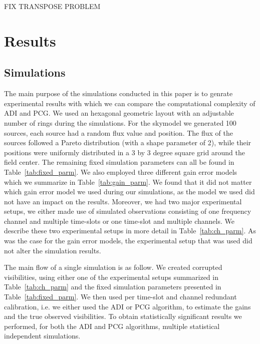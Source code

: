 \documentclass[useAMS,usenatbib]{mn2e}
\begin{document}
FIX TRANSPOSE PROBLEM

\section{Results}

\subsection{Simulations}
The main purpose of the simulations conducted in this paper is to genrate experimental results with which we can compare the computational complexity of ADI and PCG. We used an hexagonal geometric layout with an adjustable number of rings during the 
simulations. For the skymodel we generated 100 sources, each source had a random flux value and position. The flux of the sources followed a Pareto distribution (with a shape parameter of 2), while their positions were uniformly 
distributed in a 3 by 3 degree square grid around the field center. The remaining fixed simulation parameters can all be found in Table~\ref{tab:fixed_parm}. 
We also employed three different gain error models which we summarize in Table~\ref{tab:gain_parm}. We found that it did not matter which gain error model we used during
our simulations, as the model we used did not have an impact on the results. Moreover, we had two major experimental setups, we either made use of simulated observations consisting of one frequency channel and multiple time-slots or one time-slot and multiple channels.
We describe these two experimental setups in more detail in Table~\ref{tab:ch_parm}. As was the case for the gain error models, the experimental setup 
that was used did not alter the simulation results. 

The main flow of a single simulation is as follow. We created corrupted visibilities, using either one of the experimental setups summarized in Table~\ref{tab:ch_parm} and
the fixed simulation parameters presented in Table~\ref{tab:fixed_parm}. We then used per time-slot and channel redundant calibration, i.e. we either used the ADI or PCG algorithm, to 
estimate the gains and the true observed visibilities. To obtain statistically significant results we performed, for both the ADI and PCG algorithms, multiple statistical independent simulations. 


\end{document}
